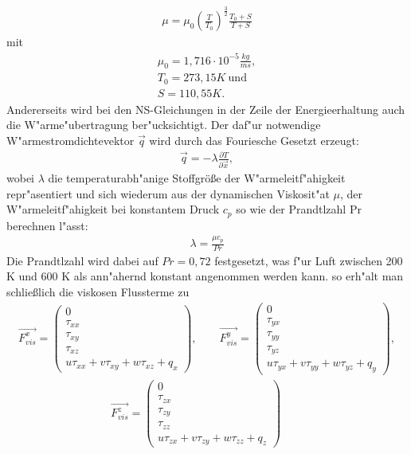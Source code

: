 \begin{gather}
	\mu = \mu_{0} \left(\frac{T}{T_{0}}\right)^\frac{3}{2} \frac{T_{0}+S}{T+S}
\end{gather}
mit
\begin{gather*}
	\mu_{0}=1,716\cdot10^{-5} \frac{kg}{ms}, \\
	T_{0}=273,15 K  \  \text{und} \\
	S = 110,55K .
\end{gather*}
Andererseits wird bei den NS-Gleichungen in der Zeile der Energieerhaltung auch die W"arme"ubertragung ber"ucksichtigt. Der daf"ur notwendige W"armestromdichtevektor $\vec{q}$ wird durch das Fouriesche Gesetzt erzeugt:
\begin{gather}
	\vec{q} = -\lambda \frac{\partial T}{\partial \vec{x}},
\end{gather}
wobei $\lambda$ die temperaturabh"anige Stoffgröße der W"armeleitf"ahigkeit repr"asentiert und sich wiederum aus der dynamischen Viskosit"at $\mu$, der W"armeleitf"ahigkeit bei konstantem Druck $c_{p}$ so wie der Prandtlzahl Pr berechnen l"asst:
\begin{gather}
	\lambda = \frac{\mu c_{p}}{Pr}
\end{gather}
Die Prandtlzahl wird dabei auf $Pr = 0,72$ festgesetzt, was f"ur Luft zwischen 200 K und 600 K als ann"ahernd konstant angenommen werden kann.
so erh"alt man schließlich die viskosen Flussterme zu
\begin{gather*}
	\vec{F_{vis}^{x}}=\left(\begin{array}{c} 0\\ \tau_{xx}\\ \tau_{xy} \\ \tau_{xz} \\ u\tau_{xx}+v\tau_{xy}+w\tau_{xz}+q_{x} \end{array}\right), \qquad  \vec{F_{vis}^{y}}=\left(\begin{array}{c} 0\\ \tau_{yx}\\ \tau_{yy} \\ \tau_{yz} \\ u\tau_{yx}+v\tau_{yy}+w\tau_{yz}+q_{y} \end{array}\right),  
\end{gather*}
\begin{gather}
	\vec{F_{vis}^{z}}=\left(\begin{array}{c} 0\\ \tau_{zx}\\ \tau_{zy} \\ \tau_{zz} \\ u\tau_{zx}+v\tau_{zy}+w\tau_{zz}+q_{z} \end{array}\right) \qquad 
\end{gather}


